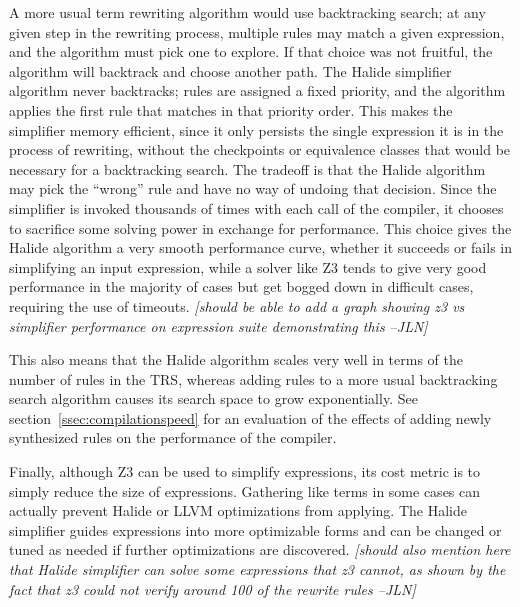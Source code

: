 \documentclass[sigplan,10pt,review,anonymous]{acmart}\settopmatter{printfolios=true,printccs=false,printacmref=false}
\newcommand{\jln}[1]{\textcolor{uwpurple}{\textit{[{#1} --JLN]}}}
\begin{document}
A more usual term rewriting algorithm would use backtracking search; at any given step in the rewriting process, multiple rules may match a given expression, and the algorithm must pick one to explore. If that choice was not fruitful, the algorithm will backtrack and choose another path. The Halide simplifier algorithm never backtracks; rules are assigned a fixed priority, and the algorithm applies the first rule that matches in that priority order. This makes the simplifier memory efficient, since it only persists the single expression it is in the process of rewriting, without the checkpoints or equivalence classes that would be necessary for a backtracking search. The tradeoff is that the Halide algorithm may pick the ``wrong'' rule and have no way of undoing that decision. Since the simplifier is invoked thousands of times with each call of the compiler, it chooses to sacrifice some solving power in exchange for performance. This choice gives the Halide algorithm a very smooth performance curve, whether it succeeds or fails in simplifying an input expression, while a solver like Z3 tends to give very good performance in the majority of cases but get bogged down in difficult cases, requiring the use of timeouts. \jln{should be able to add a graph showing z3 vs simplifier performance on expression suite demonstrating this}

This also means that the Halide algorithm scales very well in terms of the number of rules in the TRS, whereas adding rules to a more usual backtracking search algorithm causes its search space to grow exponentially. See section~\ref{ssec:compilationspeed} for an evaluation of the effects of adding newly synthesized rules on the performance of the compiler. 

Finally, although Z3 can be used to simplify expressions, its cost metric is to simply reduce the size of expressions. Gathering like terms in some cases can actually prevent Halide or LLVM optimizations from applying. The Halide simplifier guides expressions into more optimizable forms and can be changed or tuned as needed if further optimizations are discovered. \jln{should also mention here that Halide simplifier can solve some expressions that z3 cannot, as shown by the fact that z3 could not verify around 100 of the rewrite rules}

\end{document}
